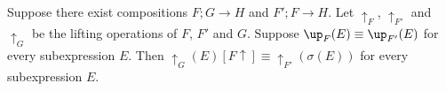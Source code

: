 \begin{lm}
Suppose there exist compositions $F;G \rightarrow H$ and $F';F \rightarrow H$.
Let $\uparrow_F$, $\uparrow_{F'}$ and $\uparrow_G$ be the lifting operations of $F$, $F'$ and $G$.
Suppose $\up_F(E) \equiv \up_{F'}(E)$ for every subexpression $E$.  Then
$\uparrow_G(E)[F \uparrow] \equiv \uparrow_{F'}(\sigma(E))$ for every subexpression $E$.
\end{lm}

\begin{code}%
\> \AgdaSymbol{:}  \AgdaSymbol{\{}\AgdaSymbol{\}} \AgdaSymbol{\{}\AgdaSymbol{\}} \AgdaSymbol{\{}\AgdaSymbol{\}} \AgdaSymbol{\{}\AgdaSymbol{\}} \AgdaSymbol{(} \AgdaSymbol{:}    \AgdaSymbol{)} \AgdaSymbol{(} \AgdaSymbol{:}    \AgdaSymbol{)}\<%
\\
\>[0]\<[2]%
\>[2]\AgdaSymbol{\{}\AgdaSymbol{\}} \AgdaSymbol{\{}\AgdaSymbol{\}} \AgdaSymbol{\{}\AgdaSymbol{\}} \AgdaSymbol{\{}\AgdaSymbol{\}} \AgdaSymbol{\{}\AgdaSymbol{\}} \AgdaSymbol{\{} \AgdaSymbol{:}    \AgdaSymbol{\}} \<%
\\
\>[0]\<[2]%
\>[2] \AgdaSymbol{\{}\AgdaSymbol{\}} \AgdaSymbol{\{}\AgdaSymbol{\}} \AgdaSymbol{\{}\AgdaSymbol{\}} \AgdaSymbol{\{}\AgdaSymbol{\}} \AgdaSymbol{\{} \AgdaSymbol{:}    \AgdaSymbol{\}}    \AgdaSymbol{(}  \AgdaSymbol{\{}\AgdaSymbol{\}} \AgdaSymbol{\{}\AgdaSymbol{\})}     \AgdaSymbol{(}  \AgdaSymbol{\{}\AgdaSymbol{\}} \AgdaSymbol{\{}\AgdaSymbol{\})} \AgdaSymbol{)} \<%
\\
\>[0]\<[2]%
\>[2] \AgdaSymbol{\{} \AgdaSymbol{:}    \AgdaSymbol{\}}    \AgdaSymbol{(}   \AgdaSymbol{)} \AgdaSymbol{(}  \AgdaSymbol{(} \AgdaSymbol{)} \AgdaSymbol{)}    \AgdaSymbol{(} \AgdaSymbol{)} \AgdaSymbol{(}   \AgdaSymbol{)}\<%

\end{code}
